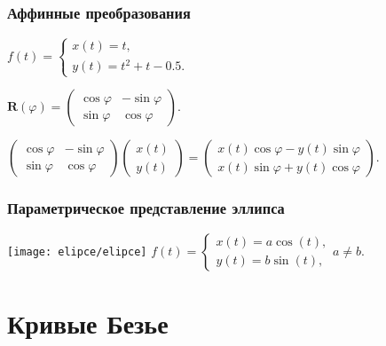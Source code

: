\documentclass[10pt]{beamer}
\begin{document}
\begin{frame}\frametitle{Аффинные преобразования}
	
	{
	}{
		$
		f(t)=
		\begin{cases}
			x(t)=t,\\
			y(t)=t^2+t-0.5.
		\end{cases}
		$
		
		\vspace{2ex}
		
		$
		\mathbf R(\varphi)=
		\begin{pmatrix}
			\cos\varphi & -\sin\varphi \\
			\sin\varphi &  \cos\varphi
		\end{pmatrix}.
		$
		
		\vspace{2ex}	

	}
	{
		
	}{
	
	$
	\begin{pmatrix}
		\cos\varphi & -\sin\varphi \\
		\sin\varphi &  \cos\varphi
	\end{pmatrix}
	\begin{pmatrix}
		x(t)\\
		y(t)
	\end{pmatrix}
	=
	\begin{pmatrix}
		x(t)\cos\varphi - y(t)\sin\varphi  \\
		x(t)\sin\varphi  + y(t)\cos\varphi
	\end{pmatrix}.
	$
		
	}
	

	
\end{frame}

\begin{frame}\frametitle{Параметрическое представление эллипса}

{
	\texttt{[image: elipce/elipce]}
}{
	$
	f(t)=
	\begin{cases}
		x(t)=a\cos(t),\\
		y(t)=b\sin(t),
	\end{cases}
	a\neq b.
	$
}	



	
\end{frame}

\section{Кривые Безье}
\frame{\sectionpage}
\end{document}
